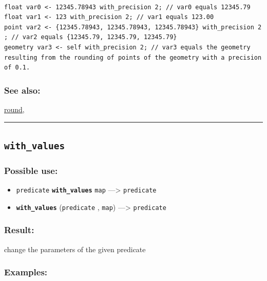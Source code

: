 \documentclass[]{book}
\providecommand{\tightlist}{%
  \setlength{\itemsep}{0pt}\setlength{\parskip}{0pt}}
\theoremstyle{definition}
\theoremstyle{definition}
\theoremstyle{definition}
\theoremstyle{remark}
\begin{document}
\begin{verbatim}
 
float var0 <- 12345.78943 with_precision 2; // var0 equals 12345.79 
float var1 <- 123 with_precision 2; // var1 equals 123.00 
point var2 <- {12345.78943, 12345.78943, 12345.78943} with_precision 2 ; // var2 equals {12345.79, 12345.79, 12345.79} 
geometry var3 <- self with_precision 2; // var3 equals the geometry resulting from the rounding of points of the geometry with a precision of 0.1.
\end{verbatim}

\subsubsection{See also:}\label{see-also-224}

\href{operators-n-to-r.html\#round}{round},

\begin{center}\rule{0.5\linewidth}{\linethickness}\end{center}

\subsection{\texorpdfstring{\texttt{with\_values}}{with\_values}}\label{with_values}

\subsubsection{Possible use:}\label{possible-use-561}

\begin{itemize}
\tightlist
\item
  \texttt{predicate} \textbf{\texttt{with\_values}} \texttt{map}
  ---\textgreater{} \texttt{predicate}
\item
  \textbf{\texttt{with\_values}} (\texttt{predicate} , \texttt{map})
  ---\textgreater{} \texttt{predicate}
\end{itemize}

\subsubsection{Result:}\label{result-540}

change the parameters of the given predicate

\subsubsection{Examples:}\label{examples-388}
\end{document}
